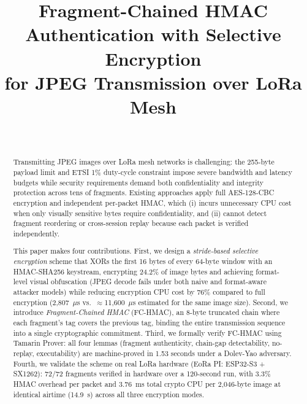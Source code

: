 \documentclass[journal]{IEEEtran}
\begin{document}
\title{Fragment-Chained HMAC Authentication with Selective Encryption\\
for JPEG Transmission over LoRa Mesh}

\author{%
  \\
}

\maketitle

\begin{abstract}
Transmitting JPEG images over LoRa mesh networks is challenging: the 255-byte
payload limit and ETSI 1\% duty-cycle constraint impose severe bandwidth and
latency budgets while security requirements demand both confidentiality and
integrity protection across tens of fragments.  Existing approaches apply full
AES-128-CBC encryption and independent per-packet HMAC, which (i) incurs
unnecessary CPU cost when only visually sensitive bytes require confidentiality,
and (ii) cannot detect fragment reordering or cross-session replay because each
packet is verified independently.

This paper makes four contributions.  First, we design a
\emph{stride-based selective encryption} scheme that XORs the first 16 bytes
of every 64-byte window with an HMAC-SHA256 keystream, encrypting 24.2\% of
image bytes and achieving format-level visual obfuscation (JPEG decode fails
under both naive and format-aware attacker models) while reducing encryption
CPU cost by 76\% compared to full encryption (2{,}807~$\mu$s vs.\
$\approx$11{,}600~$\mu$s estimated for the same image size). Second, we
introduce \emph{Fragment-Chained HMAC} (FC-HMAC), an 8-byte truncated chain
where each fragment's tag covers the previous tag, binding the entire
transmission sequence into a single cryptographic commitment. Third, we formally
verify FC-HMAC using Tamarin Prover: all four lemmas (fragment authenticity,
chain-gap detectability, no-replay, executability) are machine-proved in 1.53
seconds under a Dolev-Yao adversary. Fourth, we validate the scheme on real
LoRa hardware (EoRa PI: ESP32-S3 + SX1262): 72/72 fragments verified in
hardware over a 120-second run, with 3.3\% HMAC overhead per packet and
3.76~ms total crypto CPU per 2{,}046-byte image at identical airtime (14.9~s)
across all three encryption modes.
\end{abstract}
\end{document}
